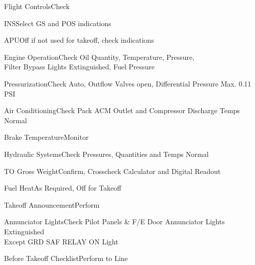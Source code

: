 \documentclass[sim-use, blue_items]{checklist}
\begin{document}
\begin{continuedchecklist}
	\item{Flight Controls}{Check}
	\item{INS}{Select GS and POS indications}
	\item{APU}{Off if not used for takeoff, check indications}
	\item{Engine Operation}{Check Oil Quantity, Temperature, Pressure,\\Filter Bypass Lights Extinguished, Fuel Pressure}
	\item{Pressurization}{Check Auto, Outflow Valves open, Differential Pressure Max. 0.11 PSI}
	\item{Air Conditioning}{Check Pack ACM Outlet and Compressor Discharge Temps Normal}
	\item{Brake Temperature}{Monitor}
	\item{Hydraulic Systems}{Check Pressures, Quantities and Temps Normal}
	\item{TO Gross Weight}{Confirm, Crosscheck Calculator and Digital Readout}
	\item{Fuel Heat}{As Required, Off for Takeoff}
	\item{Takeoff Announcement}{Perform}
	\item{Annunciator Lights}{Check Pilot Panels \& F/E Door Annunciator Lights Extinguished\\Except GRD SAF RELAY ON Light}
		\item{Before Takeoff Checklist}{Perform to Line}
\end{continuedchecklist}
\end{document}
